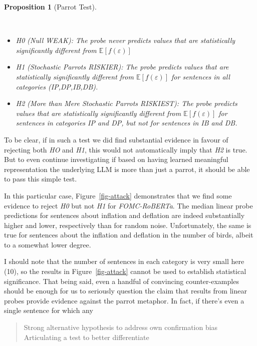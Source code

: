 \documentclass{article}
\theoremstyle{plain}
\newtheorem{proposition}[theorem]{Proposition}
\theoremstyle{definition}
\theoremstyle{remark}
\begin{document}
\begin{proposition}[Parrot
Test]\protect\hypertarget{prp-line}{}\label{prp-line}

~

\begin{itemize}
\tightlist
\item
  \emph{H0} (Null \emph{WEAK}): The probe never predicts values that are
  statistically significantly different from
  \(\mathbb{E}[f(\varepsilon)]\)
\item
  \emph{H1} (Stochastic Parrots \emph{RISKIER}): The probe predicts
  values that are statistically significantly different from
  \(\mathbb{E}[f(\varepsilon)]\) for sentences in all categories
  (IP,DP,IB,DB).
\item
  \emph{H2} (More than Mere Stochastic Parrots \emph{RISKIEST}): The
  probe predicts values that are statistically significantly different
  from \(\mathbb{E}[f(\varepsilon)]\) for sentences in categories IP and
  DP, but not for sentences in IB and DB.
\end{itemize}

\end{proposition}

To be clear, if in such a test we did find substantial evidence in
favour of rejecting both \emph{HO} and \emph{H1}, this would not
automatically imply that \emph{H2} is true. But to even continue
investigating if based on having learned meaningful representation the
underlying LLM is more than just a parrot, it should be able to pass
this simple test.

In this particular case, Figure~\ref{fig-attack} demonstrates that we
find some evidence to reject \emph{H0} but not \emph{H1} for
\emph{FOMC-RoBERTa}. The median linear probe predictions for sentences
about inflation and deflation are indeed substantially higher and lower,
respectively than for random noise. Unfortunately, the same is true for
sentences about the inflation and deflation in the number of birds,
albeit to a somewhat lower degree.

I should note that the number of sentences in each category is very
small here (10), so the results in Figure~\ref{fig-attack} cannot be
used to establish statistical significance. That being said, even a
handful of convincing counter-examples should be enough for us to
seriously question the claim that results from linear probes provide
evidence against the parrot metaphor. In fact, if there's even a single
sentence for which any

\begin{quote}
Strong alternative hypothesis to address own confirmation bias
Articulating a test to better differentiate
\end{quote}
\end{document}
